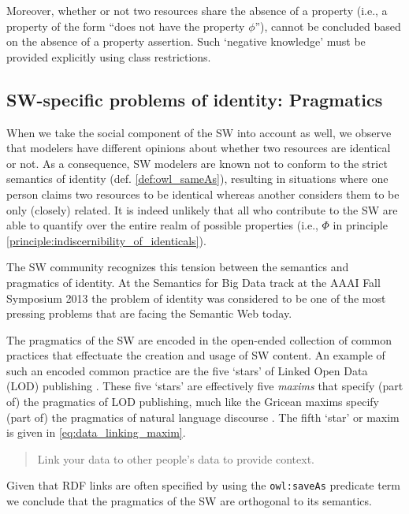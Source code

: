 Moreover, whether or not two resources share the absence of a property
  (i.e., a property of the form ``does not have the property $\phi$''),
  cannot be concluded based on the absence of a property assertion.
Such `negative knowledge' must be provided explicitly
  using class restrictions.

\subsection{SW-specific problems of identity: Pragmatics}

When we take the social component of the SW into account as well,
  we observe that modelers have different opinions about
  whether two resources are identical or not.
As a consequence, SW modelers are known not to conform to
  the strict semantics of identity (def. \ref{def:owl_sameAs}),
  resulting in situations where one person
  claims two resources to be identical
  whereas another considers them to be only (closely) related.
It is indeed unlikely that all who contribute to the SW
  are able to quantify over the entire realm of possible properties
  (i.e., $\Phi$ in principle \ref{principle:indiscernibility_of_identicals}).

The SW community recognizes this tension between
  the semantics and pragmatics of identity.
At the Semantics for Big Data track at the AAAI Fall Symposium 2013
  \cite{SemanticsBigData2013}
  the problem of identity was considered to be one of the most
  pressing problems that are facing the Semantic Web today.

The pragmatics of the SW are encoded in the open-ended collection of
  common practices that effectuate the creation and usage of SW content.
An example of such an encoded common practice are the five `stars'
  of Linked Open Data (LOD) publishing \cite{Bernerslee2010}.
These five `stars' are effectively five \emph{maxims} that specify
  (part of) the pragmatics of LOD publishing,
  much like the Gricean maxims specify
  (part of) the pragmatics of natural language discourse \cite{Grice1989}.
The fifth `star' or maxim is given in \ref{eq:data_linking_maxim}.
\begin{principle}
  \label{eq:data_linking_maxim}
  \begin{quote}
    Link your data to other people's data to provide context.
  \end{quote}
\end{principle}

\noindent Given that RDF links are often specified by using
  the {\small \texttt{owl:saveAs}} predicate term \cite{Void2011}
  we conclude that the pragmatics of the SW are orthogonal to its semantics.


